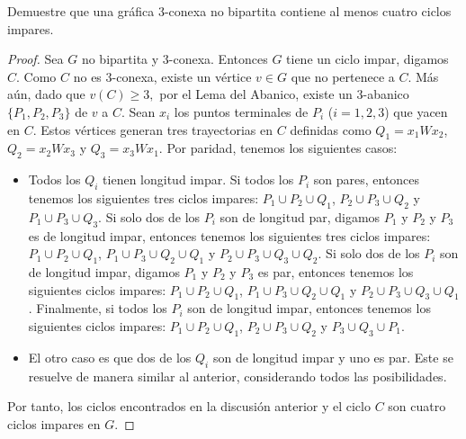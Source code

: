 \documentclass[12pt]{article}
\newenvironment{problem}[2][Problema]{\begin{trivlist}
\item[\hskip \labelsep {\bfseries #1}\hskip \labelsep {\bfseries #2.}]}{\end{trivlist}}
\begin{document}
\begin{problem}{9.2.2} Demuestre que una gráfica 3-conexa no bipartita contiene al menos cuatro ciclos impares.
\end{problem}
\begin{proof}
Sea $G$ no bipartita y 3-conexa. Entonces $G$ tiene un ciclo impar, digamos $C$. Como $C$ no es 3-conexa, existe un vértice $v \in G$ que no pertenece a $C.$ Más aún, dado que $v(C) \geq 3,$ por el Lema del Abanico, existe un $3$-abanico $\{P_1, P_2, P_3\}$ de $v$ a $C.$ Sean $x_i$ los puntos terminales de $P_i$ ($i = 1,2,3$) que yacen en $C.$ Estos vértices generan tres trayectorias en $C$ definidas como $Q_1 = x_1Wx_2$, $Q_2 = x_2 W x_3$ y $Q_3 = x_3 W x_1.$ Por paridad, tenemos los siguientes casos:

\begin{itemize}
    \item Todos los $Q_i$ tienen longitud impar. Si todos los $P_i$ son pares, entonces tenemos los siguientes tres ciclos impares: $P_1 \cup P_2 \cup Q_1$, $P_2 \cup P_3 \cup Q_2$ y $P_1 \cup P_3 \cup Q_3.$ 
    Si solo dos de los $P_i$ son de longitud par, digamos $P_1$ y $P_2$ y $P_3$ es de longitud impar, entonces tenemos los siguientes tres ciclos impares: $P_1 \cup P_2 \cup Q_1$, $P_1 \cup P_3 \cup Q_2 \cup Q_1$ y $P_2 \cup P_3 \cup Q_3 \cup Q_2.$ Si solo dos de los $P_i$ son de longitud impar, digamos $P_1$ y $P_2$ y $P_3$ es par, entonces tenemos los siguientes ciclos impares: $P_1 \cup P_2 \cup Q_1$, $P_1 \cup P_3 \cup Q_2 \cup Q_1$ y $P_2 \cup P_3 \cup Q_3 \cup Q_1$. Finalmente, si todos los $P_i$ son de longitud impar, entonces tenemos los siguientes ciclos impares: $P_1 \cup P_2 \cup Q_1$, $P_2 \cup P_3 \cup Q_2$ y $P_3 \cup Q_3 \cup P_1.$
    
    \item El otro caso es que dos de los $Q_i$ son de longitud impar y uno es par. Este se resuelve de manera similar al anterior, considerando todos las posibilidades.
\end{itemize}

Por tanto, los ciclos encontrados en la discusión anterior y el ciclo $C$ son cuatro ciclos impares en $G.$
\end{proof}
\end{document}
